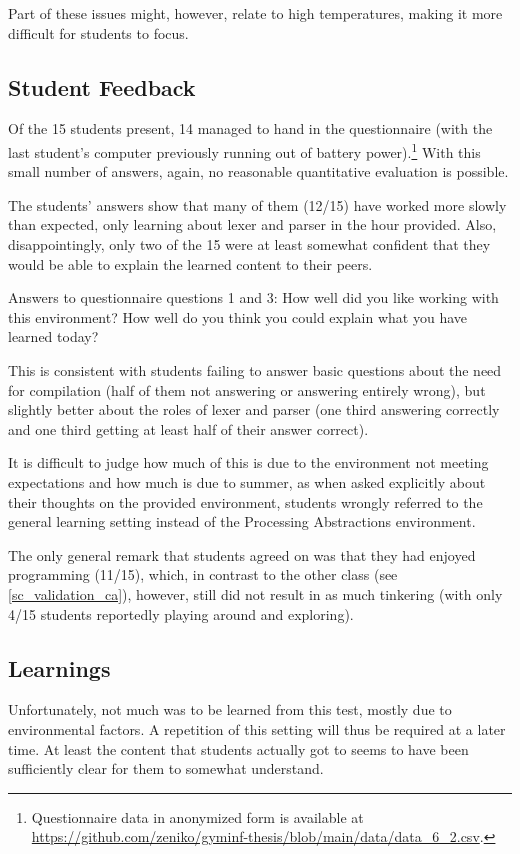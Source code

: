 Part of these issues might, however, relate to high temperatures, making it more difficult for students to focus.


\subsection{Student Feedback}

Of the 15 students present, 14 managed to hand in the questionnaire (with the last student's computer previously running out of battery power).\footnote{Questionnaire data in anonymized form is available at \url{https://github.com/zeniko/gyminf-thesis/blob/main/data/data_6_2.csv}.} With this small number of answers, again, no reasonable quantitative evaluation is possible.

The students' answers show that many of them (12/15) have worked more slowly than expected, only learning about lexer and parser in the hour provided. Also, disappointingly, only two of the 15 were at least somewhat confident that they would be able to explain the learned content to their peers.

\begin{cfigure}{Answers to questionnaire questions 1 and 3: How well did you like working with this environment? How well do you think you could explain what you have learned today?}

\end{cfigure}

This is consistent with students failing to answer basic questions about the need for compilation (half of them not answering or answering entirely wrong), but slightly better about the roles of lexer and parser (one third answering correctly and one third getting at least half of their answer correct).

It is difficult to judge how much of this is due to the environment not meeting expectations and how much is due to summer, as when asked explicitly about their thoughts on the provided environment, students wrongly referred to the general learning setting instead of the Processing Abstractions environment.

The only general remark that students agreed on was that they had enjoyed programming (11/15), which, in contrast to the other class (see \ref{sc_validation_ca}), however, still did not result in as much tinkering (with only 4/15 students reportedly playing around and exploring).


\subsection{Learnings}

Unfortunately, not much was to be learned from this test, mostly due to environmental factors. A repetition of this setting will thus be required at a later time. At least the content that students actually got to seems to have been sufficiently clear for them to somewhat understand.
